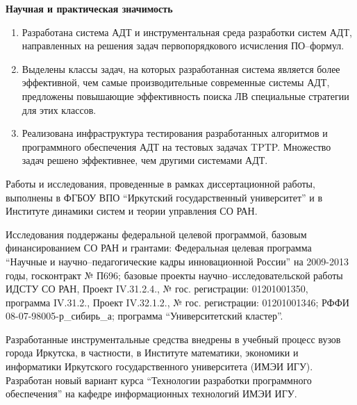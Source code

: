 \documentclass[a4paper]{report}
\begin{document}
\textbf{Научная и практическая значимость}
\begin{enumerate}
\item Разработана система АДТ и инструментальная среда разработки систем АДТ, направленных на решения задач первопорядкового исчисления ПО--формул.
\item Выделены классы задач, на которых разработанная система является более эффективной, чем самые производительные современные системы АДТ, предложены повышающие эффективность поиска ЛВ специальные стратегии для этих классов.
\item Реализована инфраструктура тестирования разработанных алгоритмов и программного обеспечения АДТ на тестовых задачах TPTP. Множество задач решено эффективнее, чем другими системами АДТ.
\end{enumerate}


Работы и исследования, проведенные в рамках  диссертационной работы, выполнены в ФГБОУ ВПО ``Иркутский государственный университет'' и в Институте динамики систем и теории управления СО РАН.

Исследования поддержаны федеральной целевой программой, базовым финансированием СО РАН и грантами:
Федеральная целевая программа ``Научные и научно--педагогические кадры инновационной России'' на 2009-2013 годы, госконтракт № П696;
базовые проекты научно--исследовательской работы ИДСТУ СО РАН, Проект IV.31.2.4., № гос. регистрации: 01201001350, программа IV.31.2., Проект IV.32.1.2., № гос. регистрации: 01201001346;
РФФИ 08-07-98005-р\_сибирь\_а;
программа ``Университетский кластер''.

Разработанные инструментальные средства внедрены в учебный процесс вузов города Иркутска, в частности, в Институте математики, экономики и информатики Иркутского государственного университета (ИМЭИ ИГУ). Разработан новый вариант курса ``Технологии разработки программного обеспечения'' на кафедре информационных технологий ИМЭИ ИГУ.
\end{document}
